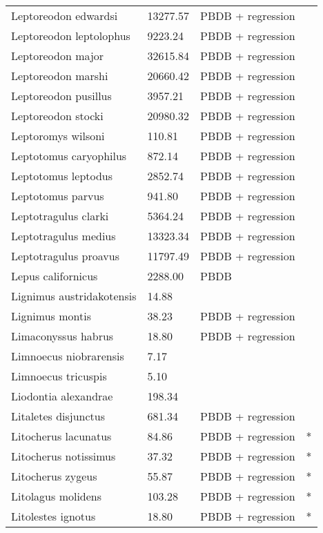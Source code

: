 \documentclass{article}
\begin{document}
\begin{center}
\begin{longtable}{p{} p{} p{} p{}}
    Leptoreodon edwardsi & 13277.57 & PBDB + regression &  \\ 
    Leptoreodon leptolophus & 9223.24 & PBDB + regression &  \\ 
    Leptoreodon major & 32615.84 & PBDB + regression &  \\ 
    Leptoreodon marshi & 20660.42 & PBDB + regression &  \\ 
    Leptoreodon pusillus & 3957.21 & PBDB + regression &  \\ 
    Leptoreodon stocki & 20980.32 & PBDB + regression &  \\ 
    Leptoromys wilsoni & 110.81 & PBDB + regression &  \\ 
    Leptotomus caryophilus & 872.14 & PBDB + regression &  \\ 
    Leptotomus leptodus & 2852.74 & PBDB + regression &  \\ 
    Leptotomus parvus & 941.80 & PBDB + regression &  \\ 
    Leptotragulus clarki & 5364.24 & PBDB + regression &  \\ 
    Leptotragulus medius & 13323.34 & PBDB + regression &  \\ 
    Leptotragulus proavus & 11797.49 & PBDB + regression &  \\ 
    Lepus californicus & 2288.00 & PBDB &  \\ 
    Lignimus austridakotensis & 14.88 & \cite{Tomiya2013} &  \\ 
    Lignimus montis & 38.23 & PBDB + regression &  \\ 
    Limaconyssus habrus & 18.80 & PBDB + regression &  \\ 
    Limnoecus niobrarensis & 7.17 & \cite{Tomiya2013} &  \\ 
    Limnoecus tricuspis & 5.10 & \cite{Tomiya2013} &  \\ 
    Liodontia alexandrae & 198.34 & \cite{Tomiya2013} &  \\ 
    Litaletes disjunctus & 681.34 & PBDB + regression &  \\ 
    Litocherus lacunatus & 84.86 & PBDB + regression & * \\ 
    Litocherus notissimus & 37.32 & PBDB + regression & * \\ 
    Litocherus zygeus & 55.87 & PBDB + regression & * \\ 
    Litolagus molidens & 103.28 & PBDB + regression & * \\ 
    Litolestes ignotus & 18.80 & PBDB + regression & * \\ 

\end{longtable}
\end{center}
\end{document}
